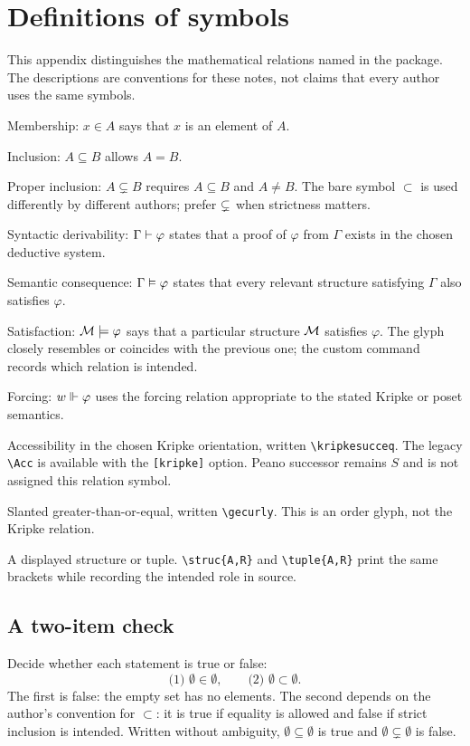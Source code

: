 \section{Definitions of symbols}

This appendix distinguishes the mathematical relations named in the
package. The descriptions are conventions for these notes, not claims
that every author uses the same symbols.

\begin{description}[leftmargin=2.8em,style=nextline]
\item[$\in$] Membership: $x\in A$ says that $x$ is an element of $A$.
\item[$\subseteq$] Inclusion: $A\subseteq B$ allows $A=B$.
\item[$\subsetneq$] Proper inclusion: $A\subsetneq B$ requires
  $A\subseteq B$ and $A\ne B$. The bare symbol $\subset$ is used
  differently by different authors; prefer $\subsetneq$ when
  strictness matters.
\item[$\vdash$] Syntactic derivability: $\Gamma\mathrel{\vdash}\varphi$
  states that a proof of $\varphi$ from $\Gamma$ exists in the chosen
  deductive system.
\item[$\vDash$] Semantic consequence: $\Gamma\mathrel{\vDash}\varphi$
  states that every relevant structure satisfying $\Gamma$ also
  satisfies $\varphi$.
\item[$\models$] Satisfaction: $\mathcal{M}\mathrel{\models}\varphi$ says that a
  particular structure $\mathcal{M}$ satisfies $\varphi$. The glyph closely
  resembles or coincides with the previous one; the custom command
  records which relation is intended.
\item[$\Vdash$] Forcing: $w\mathrel{\Vdash}\varphi$ uses the forcing relation
  appropriate to the stated Kripke or poset semantics.
\item[$\succeq$] Accessibility in the chosen Kripke orientation,
  written \verb|\kripkesucceq|. The legacy \verb|\Acc| is available
  with the \verb|[kripke]| option. Peano successor remains $S$ and
  is not assigned this relation symbol.
\item[$\geqslant$] Slanted greater-than-or-equal, written
  \verb|\gecurly|. This is an order glyph, not the Kripke relation.
\item[$\langle A,R\rangle$] A displayed structure or tuple.
  \verb|\struc{A,R}| and \verb|\tuple{A,R}| print the same brackets
  while recording the intended role in source.
\end{description}

\subsection{A two-item check}
Decide whether each statement is true or false:
\[
  \text{(1) }\emptyset\in\emptyset,
  \qquad
  \text{(2) }\emptyset\subset\emptyset.
\]
The first is false: the empty set has no elements. The second depends
on the author's convention for $\subset$: it is true if equality is
allowed and false if strict inclusion is intended. Written without
ambiguity, $\emptyset\subseteq\emptyset$ is true and
$\emptyset\subsetneq\emptyset$ is false.
